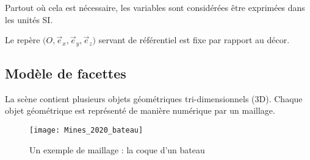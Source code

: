 Partout où cela est nécessaire, les variables sont considérées être exprimées dans les unités SI. 

Le repère $\bigl(O, \vec e_x, \vec e_y, \vec e_z\bigr)$ servant de référentiel est fixe par rapport au décor.
\subsection*{Modèle de facettes} 
La scène contient plusieurs objets géométriques tri-dimensionnels (3D). Chaque objet géométrique
est représenté de manière numérique par un maillage. 
\begin{figure}[ht]
\begin{center}
\texttt{[image: Mines\_2020\_bateau]}
\caption{Un exemple de maillage : la coque d'un bateau}
\end{center}
\end{figure}

